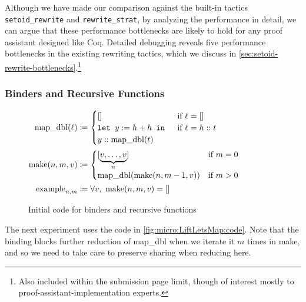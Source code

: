 Although we have made our comparison against the built-in tactics \texttt{setoid_rewrite} and \texttt{rewrite_strat}, by analyzing the performance in detail, we can argue that these performance bottlenecks are likely to hold for any proof assistant designed like Coq.
Detailed debugging reveals five performance bottlenecks in the existing rewriting tactics, which we discuss in \autoref{sec:setoid-rewrite-bottlenecks}.\footnote{Also included within the submission page limit, though of interest mostly to proof-assistant-implementation experts.}

\subsubsection{Binders and Recursive Functions} \label{sec:micro:LiftLetsMap}

\begin{figure}
{\small %
$\begin{aligned}
  \text{map\_dbl}(\ell) & \defeq \begin{cases} [] & \text{if }\ell = [] \\
      \letin[{y := h + h}{}] & \text{if }\ell = h::t \\
      y :: \text{map\_dbl}(t) &
      \end{cases} \\
  \text{make}(n, m, v) & \defeq \begin{cases} [\underbrace{v, \ldots, v}_n] & \text{if }m = 0 \\
      \text{map\_dbl}(\text{make}(n, m-1, v)) & \text{if }m > 0
      \end{cases} \\
  \text{example}_{n, m} & \defeq \forall v,\ \text{make}(n, m, v) = []
\end{aligned}$}%
\caption{\label{fig:micro:LiftLetsMap:code}Initial code for binders and recursive functions}
\end{figure}

The next experiment uses the code in \autoref{fig:micro:LiftLetsMap:code}.
Note that the  binding blocks further reduction of map\_dbl when we iterate it $m$ times in make, and so we need to take care to preserve sharing when reducing here.

